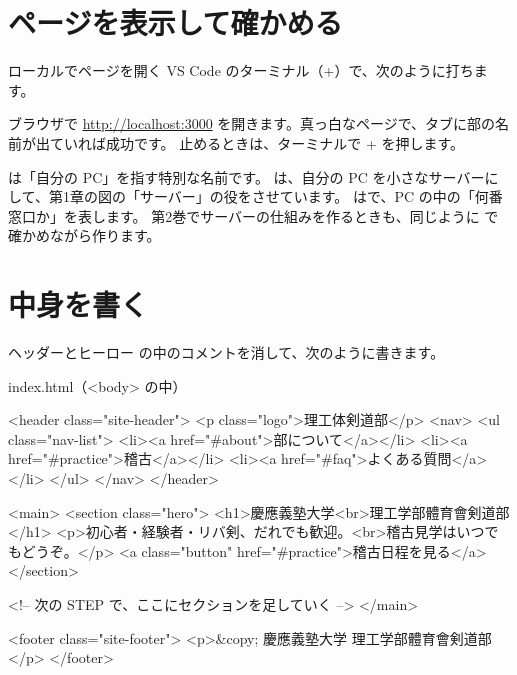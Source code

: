 \section{ページを表示して確かめる}

\begin{step}{ローカルでページを開く}
VS Code のターミナル（+）で、次のように打ちます。
ブラウザで \url{http://localhost:3000} を開きます。真っ白なページで、タブに部の名前が出ていれば成功です。
止めるときは、ターミナルで + を押します。
\end{step}

\begin{why}[localhost とは]
 は「自分の PC」を指す特別な名前です。
 は、自分の PC を小さなサーバーにして、第1章の図の「サーバー」の役をさせています。
 はで、PC の中の「何番窓口か」を表します。
第2巻でサーバーの仕組みを作るときも、同じように  で確かめながら作ります。
\end{why}

\section{中身を書く}

\begin{step}{ヘッダーとヒーロー}
 の中のコメントを消して、次のように書きます。
\begin{filebox}{index.html（<body> の中）}
\begin{Piton}[language=code]
  <header class="site-header">
    <p class="logo">理工体剣道部</p>
    <nav>
      <ul class="nav-list">
        <li><a href="#about">部について</a></li>
        <li><a href="#practice">稽古</a></li>
        <li><a href="#faq">よくある質問</a></li>
      </ul>
    </nav>
  </header>

  <main>
    <section class="hero">
      <h1>慶應義塾大学<br>理工学部體育會剣道部</h1>
      <p>初心者・経験者・リバ剣、だれでも歓迎。<br>稽古見学はいつでもどうぞ。</p>
      <a class="button" href="#practice">稽古日程を見る</a>
    </section>

    <!-- 次の STEP で、ここにセクションを足していく -->
  </main>

  <footer class="site-footer">
    <p>&copy; 慶應義塾大学 理工学部體育會剣道部</p>
  </footer>
\end{Piton}
\end{filebox}
\end{step}

